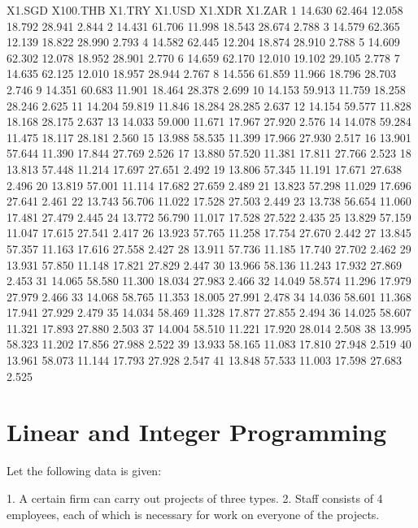 \documentclass[a4paper,11pt]{scrartcl}
\begin{document}
\begin{Schunk}
\begin{Soutput}
   X1.SGD X100.THB X1.TRY X1.USD X1.XDR X1.ZAR
1  14.630   62.464 12.058 18.792 28.941  2.844
2  14.431   61.706 11.998 18.543 28.674  2.788
3  14.579   62.365 12.139 18.822 28.990  2.793
4  14.582   62.445 12.204 18.874 28.910  2.788
5  14.609   62.302 12.078 18.952 28.901  2.770
6  14.659   62.170 12.010 19.102 29.105  2.778
7  14.635   62.125 12.010 18.957 28.944  2.767
8  14.556   61.859 11.966 18.796 28.703  2.746
9  14.351   60.683 11.901 18.464 28.378  2.699
10 14.153   59.913 11.759 18.258 28.246  2.625
11 14.204   59.819 11.846 18.284 28.285  2.637
12 14.154   59.577 11.828 18.168 28.175  2.637
13 14.033   59.000 11.671 17.967 27.920  2.576
14 14.078   59.284 11.475 18.117 28.181  2.560
15 13.988   58.535 11.399 17.966 27.930  2.517
16 13.901   57.644 11.390 17.844 27.769  2.526
17 13.880   57.520 11.381 17.811 27.766  2.523
18 13.813   57.448 11.214 17.697 27.651  2.492
19 13.806   57.345 11.191 17.671 27.638  2.496
20 13.819   57.001 11.114 17.682 27.659  2.489
21 13.823   57.298 11.029 17.696 27.641  2.461
22 13.743   56.706 11.022 17.528 27.503  2.449
23 13.738   56.654 11.060 17.481 27.479  2.445
24 13.772   56.790 11.017 17.528 27.522  2.435
25 13.829   57.159 11.047 17.615 27.541  2.417
26 13.923   57.765 11.258 17.754 27.670  2.442
27 13.845   57.357 11.163 17.616 27.558  2.427
28 13.911   57.736 11.185 17.740 27.702  2.462
29 13.931   57.850 11.148 17.821 27.829  2.447
30 13.966   58.136 11.243 17.932 27.869  2.453
31 14.065   58.580 11.300 18.034 27.983  2.466
32 14.049   58.574 11.296 17.979 27.979  2.466
33 14.068   58.765 11.353 18.005 27.991  2.478
34 14.036   58.601 11.368 17.941 27.929  2.479
35 14.034   58.469 11.328 17.877 27.855  2.494
36 14.025   58.607 11.321 17.893 27.880  2.503
37 14.004   58.510 11.221 17.920 28.014  2.508
38 13.995   58.323 11.202 17.856 27.988  2.522
39 13.933   58.165 11.083 17.810 27.948  2.519
40 13.961   58.073 11.144 17.793 27.928  2.547
41 13.848   57.533 11.003 17.598 27.683  2.525
\end{Soutput}
\end{Schunk}




\section{Linear and Integer Programming}
\label{sec:lpsolve}
\bigskip
Let the following data is given:

1. A certain firm can carry out projects of three types.
2. Staff consists of 4 employees, each of which is necessary for work on everyone of the projects.
\end{document}
